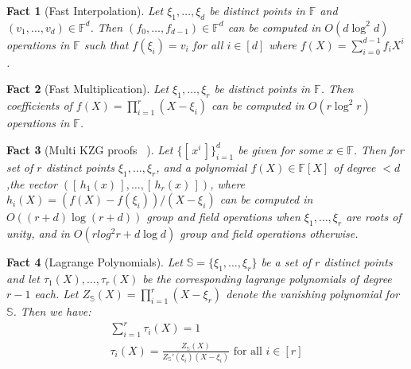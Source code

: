 \documentclass[sigconf]{acmart}
\newcommand{\F}{\mathbb{F}}
\newcommand{\elt}[1]{[\,{#1}\,]}
\newtheorem{fact}{Fact}[section]
\begin{document}
	\begin{fact}[\textsf{Fast Interpolation}]\label{fc:ifft}
		Let $\xi_1,\ldots,\xi_d$ be distinct points in $\F$ and $(v_1,\ldots,v_d)\in \F^d$. Then $(f_0,\ldots,f_{d-1})\in \F^d$
		can be computed in $O(d\log^2 d)$ operations in $\F$ such that $f(\xi_i)=v_i$ for all $i\in [d]$ where
		$f(X)=\sum_{i=0}^{d-1}f_iX^i$.
	\end{fact}
	
	\begin{fact}[\textsf{Fast Multiplication}]\label{fc:mult}
		Let $\xi_1,\ldots,\xi_r$ be distinct points in $\F$. Then coefficients of $f(X)=\prod_{i=1}^r (X-\xi_i)$
		can be computed in $O(r\log^2 r)$ operations in $\F$.
	\end{fact}
	
	\begin{fact}[\textsf{Multi KZG proofs} ~\cite{EPRINT:FeiKho23}]\label{fc:multkzg}
		Let $\{\elt{x^i}\}_{i=1}^d$ be given for some $x\in \F$. Then for set of $r$ distinct points $\xi_1,\ldots,\xi_r$,
		and a polynomial $f(X)\in \F[X]$ of degree $<d$,the vector $(\elt{h_1(x)},\ldots,\elt{h_r(x)})$,
		where $h_i(X) = (f(X) - f(\xi_i))/(X - \xi_i)$ can be computed in
		$O((r+d)\log(r+d))$ group and field operations when $\xi_1,\ldots,\xi_r$ are roots of unity, and in
		$O(rlog^2 r + d\log d)$ group and field operations otherwise.
	\end{fact}
	
	\begin{fact}[\textsf{Lagrange Polynomials}]\label{fc:lagrange}
		Let $\mathbb{S}=\{\xi_1,\ldots,\xi_r\}$ be a set of $r$ distinct points and let $\tau_1(X),\ldots,\tau_r(X)$ be
		the corresponding lagrange polynomials of degree $r-1$ each. Let $Z_{\mathbb{S}}(X)=\prod_{i=1}^r (X-\xi_r)$ denote the vanishing polynomial
		for $\mathbb{S}$. Then we have:
		\begin{gather*}
			\sum_{i=1}^r \tau_i(X) = 1 \\
			\tau_i(X) = \frac{Z_{\mathbb{S}}(X)}{Z_{\mathbb{S}}'(\xi_i)(X-\xi_i)} \text{ for all } i\in [r]
		\end{gather*}
	\end{fact}
	
\end{document}
